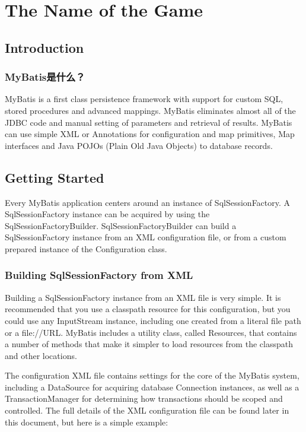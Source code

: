 
\chapter{The Name of the Game}
\section{Introduction}
\subsection{MyBatis是什么？}
MyBatis is a first class persistence framework with support for custom SQL, stored procedures and advanced mappings. MyBatis eliminates almost all of the JDBC code and manual setting of parameters and retrieval of results. MyBatis can use simple XML or Annotations for configuration and map primitives, Map interfaces and Java POJOs (Plain Old Java Objects) to database records.
\section{Getting Started}
Every MyBatis application centers around an instance of SqlSessionFactory. A SqlSessionFactory instance can be acquired by using the SqlSessionFactoryBuilder. SqlSessionFactoryBuilder can build a SqlSessionFactory instance from an XML configuration file, or from a custom prepared instance of the Configuration class.
\subsection{Building SqlSessionFactory from XML}
Building a SqlSessionFactory instance from an XML file is very simple. It is recommended that you use a classpath resource for this configuration, but you could use any InputStream instance, including one created from a literal file path or a file://URL. MyBatis includes a utility class, called Resources, that contains a number of methods that make it simpler to load resources from the classpath and other locations.



The configuration XML file contains settings for the core of the MyBatis system, including a DataSource for acquiring database Connection instances, as well as a TransactionManager for determining how transactions should be scoped and controlled. The full details of the XML configuration file can be found later in this document, but here is a simple example:

